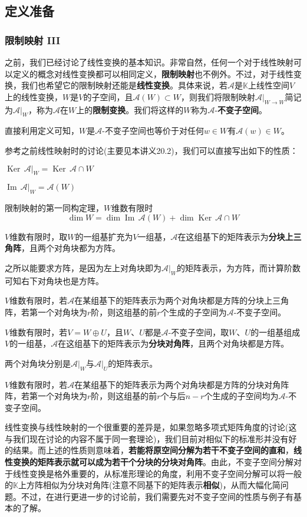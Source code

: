 \documentclass[a4paper,UTF8,fontset=windows,AutoFakeBold]{ctexart}
\DeclareMathOperator{\im}{Im\,}
\DeclareMathOperator{\Ker}{Ker\,}
\newcommand*{\ma}{\mathcal{A}}
\newcommand*{\note}{\noindent *}
\begin{document}
\subsection{定义准备}
\subsubsection{限制映射 III}
之前，我们已经讨论了线性变换的基本知识。非常自然，任何一个对于线性映射可以定义的概念对线性变换都可以相同定义，\textbf{限制映射}也不例外。不过，对于线性变换，我们也希望它的限制映射还能是\textbf{线性变换}。具体来说，若$\ma$是$\mathbb{K}$上线性空间$V$上的线性变换，$W$是$V$的子空间，且$\ma(W)\subset W$，则我们将限制映射$\ma|_{W\to W}$简记为$\ma|_W$，称为$\ma$在$W$上的\textbf{限制变换}。我们将这样的$W$称为$\ma$-\textbf{不变子空间}。

\note 直接利用定义可知，$W$是$\ma$-不变子空间也等价于对任何$w\in W$有$\ma(w)\in W$。

参考之前线性映射时的讨论(主要见本讲义20.2)，我们可以直接写出如下的性质：
\begin{compactitem}
    \item $\Ker\ma|_W=\Ker\ma\cap W$
    \item $\im\ma|_W=\ma(W)$
    \item 限制映射的第一同构定理，$W$维数有限时
    $$\dim W=\dim\im\ma(W)+\dim\Ker\ma\cap W$$
    \item $V$维数有限时，取$W$的一组基扩充为$V$一组基，$\ma$在这组基下的矩阵表示为\textbf{分块上三角阵}，且两个对角块都为方阵。
    
    \note 之所以能要求方阵，是因为左上对角块即为$\ma|_W$的矩阵表示，为方阵，而计算阶数可知右下对角块也是方阵。
    \item $V$维数有限时，若$\ma$在某组基下的矩阵表示为两个对角块都是方阵的分块上三角阵，若第一个对角块为$r$阶，则这组基的前$r$个生成的子空间为$\ma$-不变子空间。
    \item $V$维数有限时，若$V=W\oplus U$，且$W$、$U$都是$\ma$-不变子空间，取$W$、$U$的一组基组成$V$的一组基，$\ma$在这组基下的矩阵表示为\textbf{分块对角阵}，且两个对角块都是方阵。
    
    \note 两个对角块分别是$\ma|_W$与$\ma|_U$的矩阵表示。
    \item $V$维数有限时，若$\ma$在某组基下的矩阵表示为两个对角块都是方阵的分块对角阵阵，若第一个对角块为$r$阶，则这组基的前$r$个与后$n-r$个生成的子空间均为$\ma$-不变子空间。
\end{compactitem}

线性变换与线性映射的一个很重要的差异是，如果忽略多项式矩阵角度的讨论(这与我们现在讨论的内容不属于同一套理论)，我们目前对相似下的标准形并没有好的结果。而上述的性质则意味着，\textbf{若能将原空间分解为若干不变子空间的直和}，\textbf{线性变换的矩阵表示就可以成为若干个分块的分块对角阵}。由此，不变子空间分解对于线性变换是格外重要的，从标准形理论的角度，利用不变子空间分解可以将一般的$\mathbb{K}$上方阵相似为分块对角阵(注意不同基下的矩阵表示\textbf{相似})，从而大幅化简问题。不过，在进行更进一步的讨论前，我们需要先对不变子空间的性质与例子有基本的了解。
\end{document}
